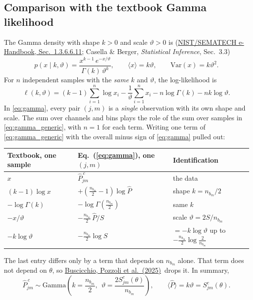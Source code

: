 \documentclass[11pt,a4paper]{article}
\newcommand{\urlPone}{https://arxiv.org/pdf/2511.03604}
\newcommand{\Pone}{\href{\urlPone}{Buscicchio, Pozzoli et al.~(2025)}}
\newcommand{\Pbar}{\hat{P}}
\begin{document}
\subsection{Comparison with the textbook Gamma likelihood}

The Gamma density with shape $k>0$ and scale $\vartheta>0$ is
(\href{https://www.itl.nist.gov/div898/handbook/eda/section3/eda366b.htm}{NIST/SEMATECH
e-Handbook, Sec.~1.3.6.6.11}; Casella \& Berger, \emph{Statistical Inference},
Sec.~3.3)
\begin{equation}
  p(x\mid k,\vartheta) = \frac{x^{k-1}\,e^{-x/\vartheta}}{\Gamma(k)\,\vartheta^{k}},
  \qquad \langle x\rangle = k\vartheta,\qquad \mathrm{Var}(x) = k\vartheta^2 .
\end{equation}
For $n$ independent samples with the \emph{same} $k$ and $\vartheta$, the
log-likelihood is
\begin{equation}
  \ell(k,\vartheta) = (k-1)\sum_{i=1}^{n}\log x_i - \frac{1}{\vartheta}\sum_{i=1}^{n} x_i
  - n\log\Gamma(k) - n k\log\vartheta .
  \label{eq:gamma_generic}
\end{equation}
In \cref{eq:gamma}, every pair $(j,m)$ is a \emph{single} observation with its own
shape and scale. The sum over channels and bins plays the role of the sum over
samples in \cref{eq:gamma_generic}, with $n=1$ for each term. Writing one term of
\cref{eq:gamma_generic} with the overall minus sign of \cref{eq:gamma} pulled out:

\begin{center}
\renewcommand{\arraystretch}{1.4}
\begin{tabular}{@{}lll@{}}
\toprule
Textbook, one sample & Eq.~(\ref{eq:gamma}), one $(j,m)$ & Identification \\
\midrule
$x$ & $\Pbar^{\,c}_{jm}$ & the data \\
$(k-1)\log x$ & $+\left(\frac{n_{b_m}}{2}-1\right)\log\Pbar$ & shape $k = n_{b_m}/2$ \\
$-\log\Gamma(k)$ & $-\log\Gamma\!\left(\frac{n_{b_m}}{2}\right)$ & same $k$ \\
$-x/\vartheta$ & $-\frac{n_{b_m}}{2}\,\Pbar/S$ & scale $\vartheta = 2S/n_{b_m}$ \\
$-k\log\vartheta$ & $-\frac{n_{b_m}}{2}\log S$ & $=-k\log\vartheta$ up to $-\frac{n_{b_m}}{2}\log\frac{2}{n_{b_m}}$ \\
\bottomrule
\end{tabular}
\end{center}

\noindent The last entry differs only by a term that depends on $n_{b_m}$ alone. That
term does not depend on $\theta$, so \Pone\ drops it. In summary,
\begin{equation}
  \Pbar^{\,c}_{jm} \sim \mathrm{Gamma}\!\left(k = \frac{n_{b_m}}{2},\ \ \vartheta = \frac{2 S^c_{jm}(\theta)}{n_{b_m}}\right),
  \qquad \langle\Pbar\rangle = k\vartheta = S^c_{jm}(\theta).
\end{equation}
\end{document}
